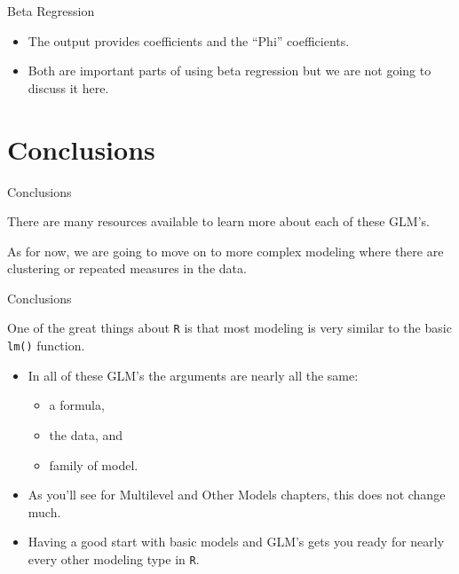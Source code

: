 \begin{frame}{Beta Regression}

\large

\begin{itemize}
\tightlist
\item
  The output provides coefficients and the ``Phi'' coefficients.
\item
  Both are important parts of using beta regression but we are not going
  to discuss it here.
\end{itemize}

\end{frame}

\section{Conclusions}\label{conclusions}

\begin{frame}{Conclusions}

\large

There are many resources available to learn more about each of these
GLM's.

As for now, we are going to move on to more complex modeling where there
are clustering or repeated measures in the data.

\end{frame}

\begin{frame}[fragile]{Conclusions}

\large

One of the great things about \texttt{R} is that most modeling is very
similar to the basic \texttt{lm()} function.

\begin{itemize}
\tightlist
\item
  In all of these GLM's the arguments are nearly all the same:

  \begin{itemize}
  \tightlist
  \item
    a formula,
  \item
    the data, and
  \item
    family of model.
  \end{itemize}
\item
  As you'll see for Multilevel and Other Models chapters, this does not
  change much.
\item
  Having a good start with basic models and GLM's gets you ready for
  nearly every other modeling type in \texttt{R}.
\end{itemize}

\end{frame}
